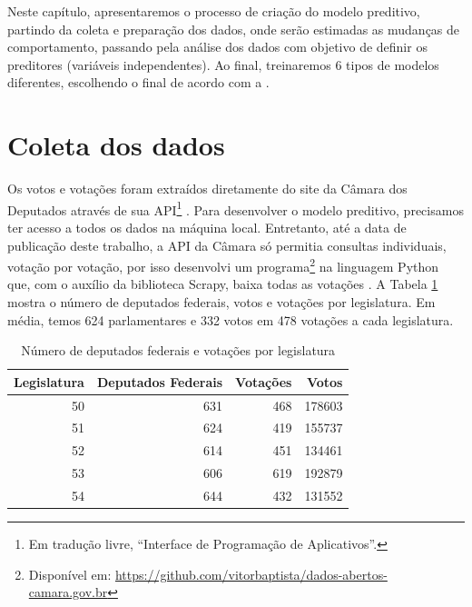 \documentclass[a4paper,titlepage]{ppgi}\usepackage[]{graphicx}\usepackage[]{color}
\newenvironment{knitrout}{}{} %
\begin{document}
Neste capítulo, apresentaremos o processo de criação do modelo preditivo,
partindo da coleta e preparação dos dados, onde serão estimadas as mudanças de
comportamento, passando pela análise dos dados com objetivo de definir os
preditores (variáveis independentes). Ao final, treinaremos 6 tipos de modelos
diferentes, escolhendo o final de acordo com a .

\section{Coleta dos dados}



Os votos e votações foram extraídos diretamente do site da Câmara dos Deputados
através de sua \gls{API}\footnote{Em tradução livre, ``Interface de Programação
de Aplicativos''.} \cite{CamaraDosDeputados2015}. Para desenvolver o modelo
preditivo, precisamos ter acesso a todos os dados na máquina local. Entretanto,
até a data de publicação deste trabalho, a \gls{API} da Câmara só permitia
consultas individuais, votação por votação, por isso desenvolvi um
programa\footnote{Disponível em:
\url{https://github.com/vitorbaptista/dados-abertos-camara.gov.br}} na
linguagem Python que, com o auxílio da biblioteca Scrapy, baixa todas as
votações \cite{Python276,Scrapy}. A Tabela
\ref{table:estatisticas-legislaturas} mostra o número de deputados federais,
votos e votações por legislatura. Em média, temos 624
parlamentares e 332 votos em
478 votações a cada legislatura.

\begin{table}
\caption{Número de deputados federais e votações por legislatura}
\label{table:estatisticas-legislaturas}
\centering
\begin{knitrout}
\color{fgcolor}
\begin{tabular}{r|r|r|r}
\hline
Legislatura & Deputados Federais & Votações & Votos\\
\hline
50 & 631 & 468 & 178603\\
\hline
51 & 624 & 419 & 155737\\
\hline
52 & 614 & 451 & 134461\\
\hline
53 & 606 & 619 & 192879\\
\hline
54 & 644 & 432 & 131552\\
\hline
\end{tabular}


\end{knitrout}
\end{table}
\end{document}
